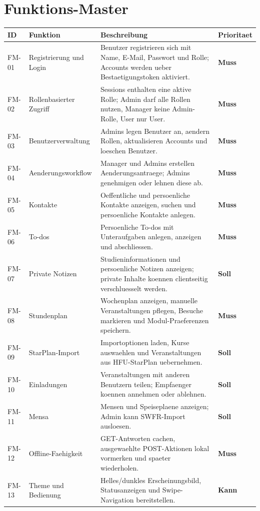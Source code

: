 \documentclass[11pt,a4paper]{article}
\newcommand{\priority}[1]{\textbf{#1}}
\newcommand{\must}{\priority{Muss}}
\newcommand{\should}{\priority{Soll}}
\newcommand{\could}{\priority{Kann}}
\begin{document}
\section{Funktions-Master}
\begin{longtable}{@{}p{18mm}p{35mm}p{77mm}p{18mm}@{}}
\toprule
ID & Funktion & Beschreibung & Prioritaet\\
\midrule
\endhead
FM-01 & Registrierung und Login & Benutzer registrieren sich mit Name, E-Mail, Passwort und Rolle; Accounts werden ueber Bestaetigungstoken aktiviert. & \must\\
FM-02 & Rollenbasierter Zugriff & Sessions enthalten eine aktive Rolle; Admin darf alle Rollen nutzen, Manager keine Admin-Rolle, User nur User. & \must\\
FM-03 & Benutzerverwaltung & Admins legen Benutzer an, aendern Rollen, aktualisieren Accounts und loeschen Benutzer. & \must\\
FM-04 & Aenderungsworkflow & Manager und Admins erstellen Aenderungsantraege; Admins genehmigen oder lehnen diese ab. & \must\\
FM-05 & Kontakte & Oeffentliche und persoenliche Kontakte anzeigen, suchen und persoenliche Kontakte anlegen. & \must\\
FM-06 & To-dos & Persoenliche To-dos mit Unteraufgaben anlegen, anzeigen und abschliessen. & \must\\
FM-07 & Private Notizen & Studieninformationen und persoenliche Notizen anzeigen; private Inhalte koennen clientseitig verschluesselt werden. & \should\\
FM-08 & Stundenplan & Wochenplan anzeigen, manuelle Veranstaltungen pflegen, Besuche markieren und Modul-Praeferenzen speichern. & \must\\
FM-09 & StarPlan-Import & Importoptionen laden, Kurse auswaehlen und Veranstaltungen aus HFU-StarPlan uebernehmen. & \should\\
FM-10 & Einladungen & Veranstaltungen mit anderen Benutzern teilen; Empfaenger koennen annehmen oder ablehnen. & \should\\
FM-11 & Mensa & Mensen und Speiseplaene anzeigen; Admin kann SWFR-Import ausloesen. & \should\\
FM-12 & Offline-Faehigkeit & GET-Antworten cachen, ausgewaehlte POST-Aktionen lokal vormerken und spaeter wiederholen. & \must\\
FM-13 & Theme und Bedienung & Helles/dunkles Erscheinungsbild, Statusanzeigen und Swipe-Navigation bereitstellen. & \could\\
\bottomrule
\end{longtable}
\end{document}

